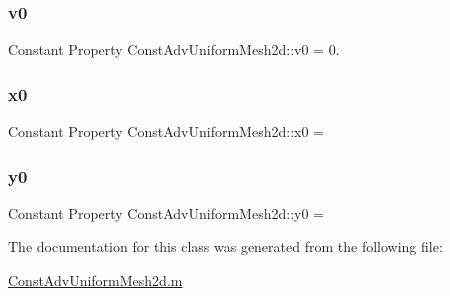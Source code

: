 \subsubsection{\texorpdfstring{v0}{v0}}
{\footnotesize\ttfamily Constant Property Const\+Adv\+Uniform\+Mesh2d\+::v0 = 0.}

\mbox{\label{class_const_adv_uniform_mesh2d_ae12f0a62657c2b190b7ee3a1d7955e51}} 
\subsubsection{\texorpdfstring{x0}{x0}}
{\footnotesize\ttfamily Constant Property Const\+Adv\+Uniform\+Mesh2d\+::x0 =}

\mbox{\label{class_const_adv_uniform_mesh2d_a3ba507bf5e834f67416624de441761ef}} 
\subsubsection{\texorpdfstring{y0}{y0}}
{\footnotesize\ttfamily Constant Property Const\+Adv\+Uniform\+Mesh2d\+::y0 =}



The documentation for this class was generated from the following file\+:\begin{DoxyCompactItemize}
\item 
\hyperlink{_const_adv_uniform_mesh2d_8m}{Const\+Adv\+Uniform\+Mesh2d.\+m}\end{DoxyCompactItemize}
